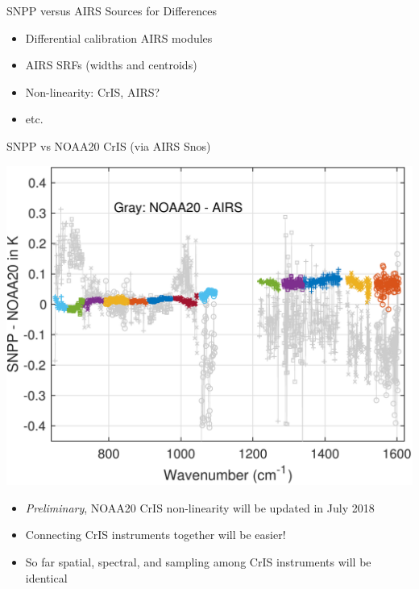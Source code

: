 \documentclass[10pt,t]{beamer}
\begin{document}
\begin{frame}[label={sec:orgeae713d}]{SNPP versus AIRS}
\small
Sources for Differences
\vspace{-0.05in}
\begin{itemize}
\item Differential calibration AIRS modules
\item AIRS SRFs (widths and centroids)
\item Non-linearity: CrIS, AIRS?
\item etc.
\end{itemize}
\end{frame}

\begin{frame}[label={sec:orgc086e73}]{SNPP vs NOAA20 CrIS (via AIRS Snos)}
\vspace{-0.1in}

\begin{center}
\includegraphics[width=0.65\linewidth]{./Figs/Pdf/sno_march2018_snpp_minus_noaa20_with_c2_airs_ingrey.pdf}
\end{center}

\vspace{-0.1in}

\small
\begin{itemize}
\item \emph{Preliminary}, NOAA20 CrIS non-linearity will be updated in July 2018
\item Connecting CrIS instruments together will be easier!
\item So far spatial, spectral, and sampling among CrIS instruments will be identical
\end{itemize}
\end{frame}
\end{document}
